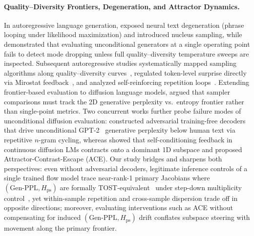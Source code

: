 \documentclass[11pt,a4paper]{article}
\begin{document}
\paragraph{Quality--Diversity Frontiers, Degeneration, and Attractor Dynamics.}
In autoregressive language generation, \citet{holtzman2020curious} exposed neural text degeneration (phrase looping under likelihood maximization) and introduced nucleus sampling, while \citet{caccia2020language} demonstrated that evaluating unconditional generators at a single operating point fails to detect mode dropping unless full quality--diversity temperature sweeps are inspected. Subsequent autoregressive studies systematically mapped sampling algorithms along quality--diversity curves~\citep{nadeem2020systematic}, regulated token-level surprise directly via Mirostat feedback~\citep{basu2021mirostat}, and analyzed self-reinforcing repetition loops~\citep{xu2022learning}. Extending frontier-based evaluation to diffusion language models, \citet{pynadath2026generative} argued that sampler comparisons must track the 2D generative perplexity vs.\ entropy frontier rather than single-point metrics. Two concurrent works further probe failure modes of unconditional diffusion evaluation: \citet{franca2026hacking} constructed adversarial training-free decoders that drive unconditional GPT-2~\citep{radford2019language} generative perplexity below human text via repetitive $n$-gram cycling, whereas \citet{zhang2026selfcond} showed that self-conditioning feedback in continuous diffusion LMs contracts onto a dominant 1D subspace and proposed Attractor-Contrast-Escape (ACE). Our study bridges and sharpens both perspectives: even without adversarial decoders, legitimate inference controls of a single trained flow model trace near-rank-1 primary Jacobians where $(\text{Gen-PPL}, H_{\mathrm{ps}})$ are formally TOST-equivalent~\citep{schuirmann1987comparison} under step-down multiplicity control~\citep{holm1979simple}, yet within-sample repetition and cross-sample dispersion trade off in opposite directions; moreover, evaluating interventions such as ACE without compensating for induced $(\text{Gen-PPL}, H_{\mathrm{ps}})$ drift conflates subspace steering with movement along the primary frontier.
\end{document}
